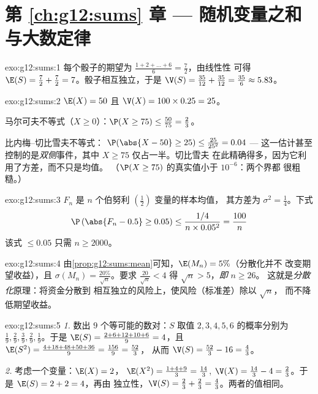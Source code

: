 \section*{第 \ref{ch:g12:sums} 章 --- 随机变量之和与大数定律}

\begin{solution}{exo:g12:sums:1}
每个骰子的期望为
$\frac{1 + 2 + \dots + 6}{6} = \frac{7}{2}$，由线性性
可得 $\E(S) = \frac72 + \frac72 = 7$。骰子相互独立，于是
$\V(S) = \frac{35}{12} + \frac{35}{12} = \frac{35}{6} \approx 5.83$。
\end{solution}

\begin{solution}{exo:g12:sums:2}
$\E(X) = 50$ 且 $\V(X) = 100 \times 0.25 = 25$。

马尔可夫不等式（$X \geq 0$）：$\P(X \geq 75) \leq \frac{50}{75} = \frac23$。

比内梅--切比雪夫不等式：
$\P(\abs{X - 50} \geq 25) \leq \frac{25}{25^2} = 0.04$ --- 这一估计甚至
控制的是\emph{双侧}事件，其中 $X \geq 75$ 仅占一半。切比雪夫
在此精确得多，因为它利用了方差，而不只是均值。
（$\P(X \geq 75)$ 的真实值小于 $10^{-6}$：两个界都
很粗糙。）
\end{solution}

\begin{solution}{exo:g12:sums:3}
$F_n$ 是 $n$ 个伯努利 $\left(\frac12\right)$ 变量的样本均值，
其方差为 $\sigma^2 = \frac14$。下式
\[
\P\left(\abs{F_n - 0.5} \geq 0.05\right)
\leq \frac{1/4}{n \times 0.05^2} = \frac{100}{n}
\]
该式 $\leq 0.05$ 只需 $n \geq 2000$。
\end{solution}

\begin{solution}{exo:g12:sums:4}
由\cref{prop:g12:sums:mean}可知，$\E(M_n) = 5\%$（分散化并不
改变期望收益），且
$\sigma(M_n) = \frac{20\%}{\sqrt n}$。要求
$\frac{20}{\sqrt n} < 4$ 得 $\sqrt n > 5$，\emph{即} $n \geq 26$。
这就是\emph{分散化}原理：将资金分散到
相互独立的风险上，使风险（标准差）除以 $\sqrt n$，
而不降低期望收益。
\end{solution}

\begin{solution}{exo:g12:sums:5}
\emph{1.} 数出 $9$ 个等可能的数对：$S$ 取值
$2, 3, 4, 5, 6$ 的概率分别为
$\frac19, \frac29, \frac39, \frac29, \frac19$。于是
$\E(S) = \frac{2 + 6 + 12 + 10 + 6}{9} = 4$，且
$\E(S^2) = \frac{4 + 18 + 48 + 50 + 36}{9} = \frac{156}{9} = \frac{52}{3}$，
从而 $\V(S) = \frac{52}{3} - 16 = \frac43$。

\emph{2.} 考虑一个变量：$\E(X) = 2$，
$\E(X^2) = \frac{1 + 4 + 9}{3} = \frac{14}{3}$,
$\V(X) = \frac{14}{3} - 4 = \frac23$。于是 $\E(S) = 2 + 2 = 4$，再由
独立性，$\V(S) = \frac23 + \frac23 = \frac43$。两者的值相同。
\end{solution}

